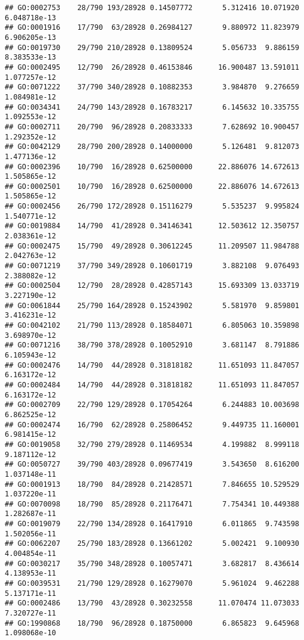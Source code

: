 \documentclass[
]{article}
\begin{document}
\begin{verbatim}
## GO:0002753    28/790 193/28928 0.14507772       5.312416 10.071920 6.048718e-13
## GO:0001916    17/790  63/28928 0.26984127       9.880972 11.823979 6.906205e-13
## GO:0019730    29/790 210/28928 0.13809524       5.056733  9.886159 8.383533e-13
## GO:0002495    12/790  26/28928 0.46153846      16.900487 13.591011 1.077257e-12
## GO:0071222    37/790 340/28928 0.10882353       3.984870  9.276659 1.084981e-12
## GO:0034341    24/790 143/28928 0.16783217       6.145632 10.335755 1.092553e-12
## GO:0002711    20/790  96/28928 0.20833333       7.628692 10.900457 1.292352e-12
## GO:0042129    28/790 200/28928 0.14000000       5.126481  9.812073 1.477136e-12
## GO:0002396    10/790  16/28928 0.62500000      22.886076 14.672613 1.505865e-12
## GO:0002501    10/790  16/28928 0.62500000      22.886076 14.672613 1.505865e-12
## GO:0002456    26/790 172/28928 0.15116279       5.535237  9.995824 1.540771e-12
## GO:0019884    14/790  41/28928 0.34146341      12.503612 12.350757 2.038361e-12
## GO:0002475    15/790  49/28928 0.30612245      11.209507 11.984788 2.042763e-12
## GO:0071219    37/790 349/28928 0.10601719       3.882108  9.076493 2.388082e-12
## GO:0002504    12/790  28/28928 0.42857143      15.693309 13.033719 3.227190e-12
## GO:0061844    25/790 164/28928 0.15243902       5.581970  9.859801 3.416231e-12
## GO:0042102    21/790 113/28928 0.18584071       6.805063 10.359898 3.698970e-12
## GO:0071216    38/790 378/28928 0.10052910       3.681147  8.791886 6.105943e-12
## GO:0002476    14/790  44/28928 0.31818182      11.651093 11.847057 6.163172e-12
## GO:0002484    14/790  44/28928 0.31818182      11.651093 11.847057 6.163172e-12
## GO:0002709    22/790 129/28928 0.17054264       6.244883 10.003698 6.862525e-12
## GO:0002474    16/790  62/28928 0.25806452       9.449735 11.160001 6.981415e-12
## GO:0019058    32/790 279/28928 0.11469534       4.199882  8.999118 9.187112e-12
## GO:0050727    39/790 403/28928 0.09677419       3.543650  8.616200 1.037148e-11
## GO:0001913    18/790  84/28928 0.21428571       7.846655 10.529529 1.037220e-11
## GO:0070098    18/790  85/28928 0.21176471       7.754341 10.449388 1.282687e-11
## GO:0019079    22/790 134/28928 0.16417910       6.011865  9.743598 1.502056e-11
## GO:0062207    25/790 183/28928 0.13661202       5.002421  9.100930 4.004854e-11
## GO:0030217    35/790 348/28928 0.10057471       3.682817  8.436614 4.138953e-11
## GO:0039531    21/790 129/28928 0.16279070       5.961024  9.462288 5.137171e-11
## GO:0002486    13/790  43/28928 0.30232558      11.070474 11.073033 7.320727e-11
## GO:1990868    18/790  96/28928 0.18750000       6.865823  9.645968 1.098068e-10

\end{verbatim}
\end{document}
